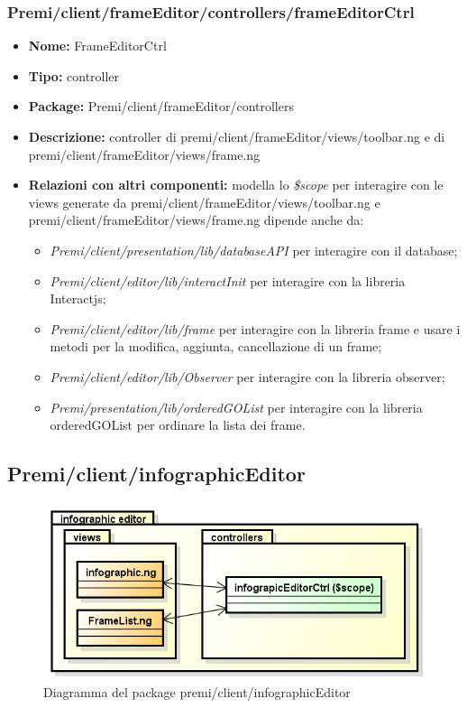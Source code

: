 \subsubsection{Premi/client/frameEditor/controllers/frameEditorCtrl}
\begin{itemize}
  \item[] \textbf{Nome:} FrameEditorCtrl
  \item[] \textbf{Tipo:} controller
  \item[] \textbf{Package:} Premi/client/frameEditor/controllers
  \item[] \textbf{Descrizione:} controller di premi/client/frameEditor/views/toolbar.ng e di premi/client/frameEditor/views/frame.ng
  \item[] \textbf{Relazioni con altri componenti:} modella lo \textit{\$scope} per interagire con le views generate da premi/client/frameEditor/views/toolbar.ng e premi/client/frameEditor/views/frame.ng dipende anche da:
 \begin{itemize} 
	\item \textit{Premi/client/presentation/lib/databaseAPI} per interagire con il database;  
	\item \textit{Premi/client/editor/lib/interactInit} per interagire con la libreria Interactjs;
	\item \textit{Premi/client/editor/lib/frame} per interagire con la libreria frame e usare i metodi per la modifica, aggiunta, cancellazione di un frame;
	\item \textit{Premi/client/editor/lib/Observer} per interagire con la libreria observer; 
	\item \textit{Premi/presentation/lib/orderedGOList} per interagire con la libreria orderedGOList per ordinare la lista dei frame. 
  \end{itemize} 
\end{itemize}

\clearpage
\subsection{Premi/client/infographicEditor}
\begin{figure}[!h]
\begin{center}
\includegraphics[scale=0.45]{img/diapkg/infographicEditor.png}
\caption{Diagramma del package premi/client/infographicEditor}
\end{center}
\end{figure}
